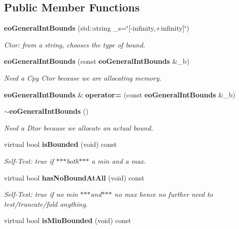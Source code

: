 \subsection*{Public Member Functions}
\begin{CompactItemize}
\item 
{\bf eo\-General\-Int\-Bounds} (std::string \_\-s=\char`\"{}[-infinity,+infinity]\char`\"{})\label{classeo_general_int_bounds_a0}

\begin{CompactList}\small\item\em Ctor: from a string, chooses the type of bound. \item\end{CompactList}\item 
{\bf eo\-General\-Int\-Bounds} (const {\bf eo\-General\-Int\-Bounds} \&\_\-b)\label{classeo_general_int_bounds_a1}

\begin{CompactList}\small\item\em Need a Cpy Ctor because we are allocating memory. \item\end{CompactList}\item 
{\bf eo\-General\-Int\-Bounds} \& {\bf operator=} (const {\bf eo\-General\-Int\-Bounds} \&\_\-b)\label{classeo_general_int_bounds_a2}

\item 
{\bf $\sim$eo\-General\-Int\-Bounds} ()\label{classeo_general_int_bounds_a3}

\begin{CompactList}\small\item\em Need a Dtor because we allocate an actual bound. \item\end{CompactList}\item 
virtual bool {\bf is\-Bounded} (void) const \label{classeo_general_int_bounds_a4}

\begin{CompactList}\small\item\em Self-Test: true if $\ast$$\ast$$\ast$both$\ast$$\ast$$\ast$ a min and a max. \item\end{CompactList}\item 
virtual bool {\bf has\-No\-Bound\-At\-All} (void) const \label{classeo_general_int_bounds_a5}

\begin{CompactList}\small\item\em Self-Test: true if no min $\ast$$\ast$$\ast$and$\ast$$\ast$$\ast$ no max hence no further need to test/truncate/fold anything. \item\end{CompactList}\item 
virtual bool {\bf is\-Min\-Bounded} (void) const \label{classeo_general_int_bounds_a6}


\end{CompactItemize}
